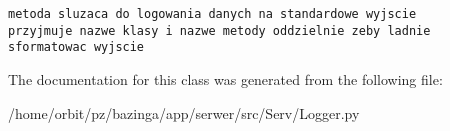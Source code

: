 \footnotesize\begin{verbatim}metoda sluzaca do logowania danych na standardowe wyjscie
przyjmuje nazwe klasy i nazwe metody oddzielnie zeby ladnie sformatowac wyjscie

\end{verbatim}
\normalsize
 

The documentation for this class was generated from the following file:\begin{CompactItemize}
\item 
/home/orbit/pz/bazinga/app/serwer/src/Serv/Logger.py\end{CompactItemize}
